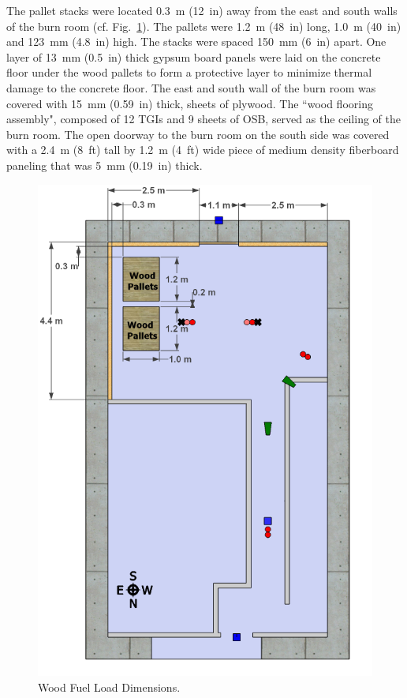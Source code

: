 \documentclass[12pt,oneside]{book}
\begin{document}
The pallet stacks were located 0.3~m (12~in) away from the east and south walls of the burn room (cf. Fig.~\ref{fig:Wood_Fuel_Load_Dimensions}). The pallets were 1.2~m (48~in) long, 1.0~m (40~in) and 123~mm (4.8~in) high. The stacks were spaced 150~mm (6~in) apart. One layer of 13~mm (0.5~in) thick gypsum board panels were laid on the concrete floor under the wood pallets to form a protective layer to minimize thermal damage to the concrete floor. The east and south wall of the burn room was covered with 15~mm (0.59~in) thick, sheets of plywood.  The ``wood flooring assembly", composed of 12 TGIs and 9 sheets of OSB, served as the ceiling of the burn room. The open doorway to the burn room on the south side was covered with a 2.4~m (8~ft) tall by 1.2~m (4~ft) wide piece of medium density fiberboard paneling that was 5~mm (0.19~in) thick.

\begin{figure}[!ht]
	\includegraphics[width=.8\columnwidth]{../Figures/Pictures/DelCoSingleStoryWoodFuelLoad}
	\caption{Wood Fuel Load Dimensions.}
	\label{fig:Wood_Fuel_Load_Dimensions}
\end{figure}
\end{document}
